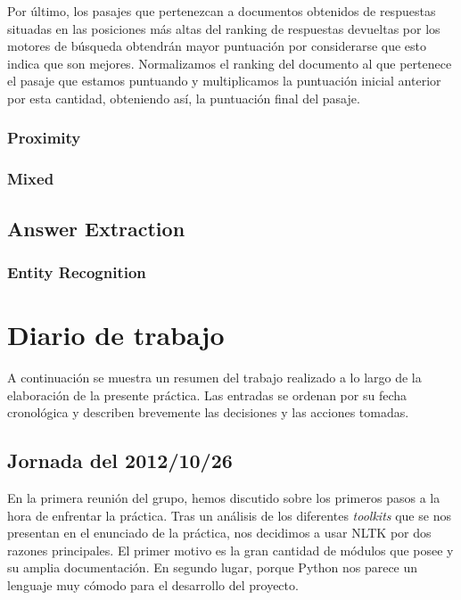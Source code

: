 \documentclass[12pt,a4paper,titlepage]{article}
\begin{document}
Por último, los pasajes que pertenezcan a documentos obtenidos de respuestas situadas en las posiciones más altas del ranking de respuestas devueltas por los motores de búsqueda obtendrán mayor puntuación por considerarse que esto indica que son mejores. Normalizamos el ranking del documento al que pertenece el pasaje que estamos puntuando y multiplicamos la puntuación inicial anterior por esta cantidad, obteniendo así, la puntuación final del pasaje.

\subsubsection{Proximity}

\subsubsection{Mixed}

\subsection{Answer Extraction}
\subsubsection{Entity Recognition}
\label{s:ne_recog}


\clearpage
\section{Diario de trabajo}
A continuación se muestra un resumen del trabajo realizado a lo largo de la elaboración de la presente práctica. Las entradas se ordenan por su fecha cronológica y describen brevemente las decisiones y las acciones tomadas.


\subsection{Jornada del 2012/10/26}
En la primera reunión del grupo, hemos discutido sobre los primeros pasos a la hora de enfrentar la práctica. Tras un análisis de los diferentes \emph{toolkits} que se nos presentan en el enunciado de la práctica, nos decidimos a usar NLTK por dos razones principales. El primer motivo es la gran cantidad de módulos que posee y su amplia documentación. En segundo lugar, porque Python nos parece un lenguaje muy cómodo para el desarrollo del proyecto.
\end{document}

